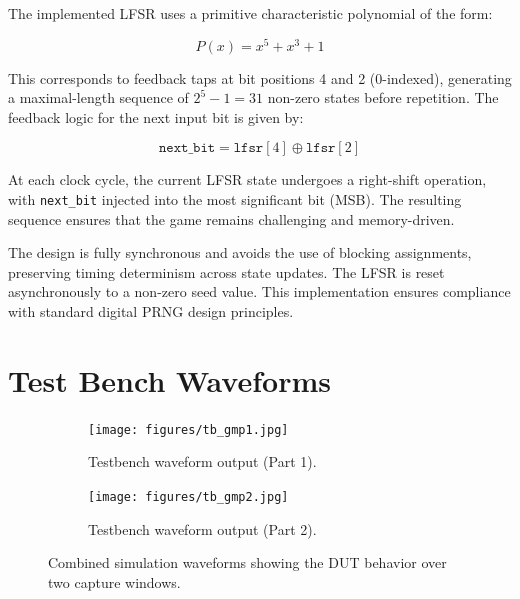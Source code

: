 \documentclass[10pt,a4paper,twocolumn,twoside]{tau-class/tau}
\begin{document}
The implemented LFSR uses a primitive characteristic polynomial of the form:

\begin{equation}
    P(x) = x^5 + x^3 + 1
\end{equation}

This corresponds to feedback taps at bit positions 4 and 2 (0-indexed), generating a maximal-length sequence of $2^5 - 1 = 31$ non-zero states before repetition. The feedback logic for the next input bit is given by:

\begin{equation} \label{eq:lfsr}
    \texttt{next\_bit} = \texttt{lfsr}[4] \oplus \texttt{lfsr}[2]
\end{equation}

At each clock cycle, the current LFSR state undergoes a right-shift operation, with \texttt{next\_bit} injected into the most significant bit (MSB). The resulting sequence ensures that the game remains challenging and memory-driven.

The design is fully synchronous and avoids the use of blocking assignments, preserving timing determinism across state updates. The LFSR is reset asynchronously to a non-zero seed value. This implementation ensures compliance with standard digital PRNG design principles.



    


\section{Test Bench Waveforms}

\begin{figure}[!t]
    \centering
    \begin{subfigure}[b]{0.9\textwidth}
        \centering
        \texttt{[image: figures/tb\_gmp1.jpg]}
        \caption{Testbench waveform output (Part 1).}
        \label{fig:tb_part1}
    \end{subfigure}
    \vspace{1em}
    \begin{subfigure}[b]{0.9\textwidth}
        \centering
        \texttt{[image: figures/tb\_gmp2.jpg]}
        \caption{Testbench waveform output (Part 2).}
        \label{fig:tb_part2}
    \end{subfigure}
    \caption{Combined simulation waveforms showing the DUT behavior over two capture windows.}
    \label{fig:tb_waveforms}
\end{figure}
 
\end{document}
